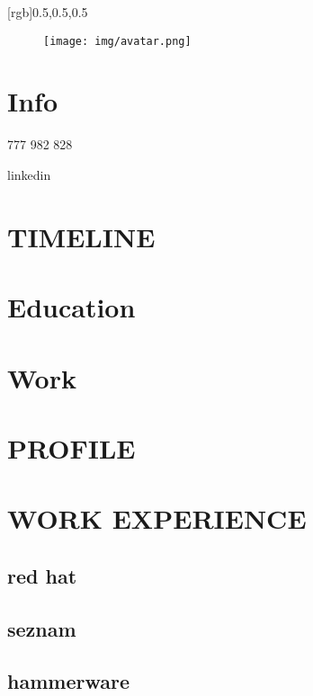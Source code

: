 \documentclass{mycv}
\begin{document}
\begin{paracol}{2}
[rgb]{0.5,0.5,0.5}

\begin{figure}[h!]
  \texttt{[image: img/avatar.png]}
\end{figure}

\section{Info}


\address{Brno}

777 982 828

linkedin


\section{TIMELINE}

\lipsum[1]

\switchcolumn

\section{Education}

\section{Work}

\section{PROFILE}

\lipsum[2]

\section{WORK EXPERIENCE}
\subsection{red hat}
\subsection{seznam}
\subsection{hammerware}


\end{paracol}
\end{document}
